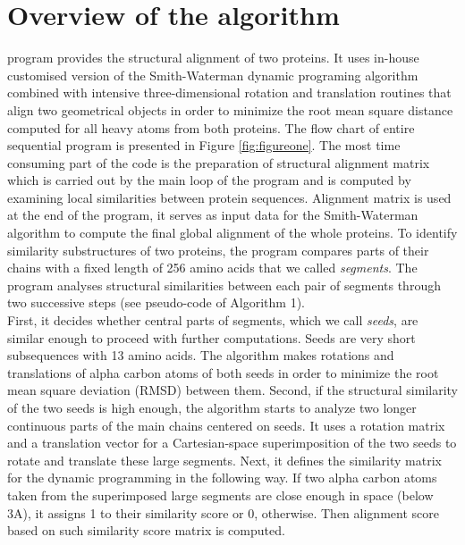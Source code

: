 \section{Overview of the algorithm}
\prog{} program provides the structural alignment of two proteins.
It uses in-house customised version of the Smith-Waterman dynamic programing
algorithm combined with intensive three-dimensional rotation and translation
routines that align two geometrical objects in order to minimize the root mean square
distance computed for all heavy atoms from both proteins.
The flow chart of entire sequential program is presented in Figure \ref{fig:figureone}.
The most time consuming part of the code is the preparation of structural
alignment matrix which is carried out by the main loop of the program and is computed by examining local similarities between protein sequences. Alignment matrix is used at the end of the program, it serves as input data for the Smith-Waterman algorithm to compute the final global alignment of the whole proteins. 
To identify similarity substructures of two proteins, the program compares
parts of their chains with a fixed length of 256 amino acids
that we called \emph{segments}.
The \prog{} program analyses structural similarities between each pair of segments through two successive steps (see pseudo-code of Algorithm 1).\\
First, it decides whether central parts of segments, which we call
\emph{seeds}, are similar enough to proceed with further computations.
Seeds are very short subsequences with 13 amino acids.
The \prog{} algorithm makes rotations and translations of alpha carbon atoms of both seeds in
order to minimize the root mean square deviation (RMSD) between them.
Second, if the structural similarity of the two seeds is high enough,
the algorithm starts to analyze two longer continuous parts of the main chains
centered on seeds.
It uses a rotation matrix and a translation vector for a Cartesian-space
superimposition of the two seeds to rotate and translate these large segments.
Next, it defines the similarity matrix for the dynamic programming in the
following way.
If two alpha carbon atoms taken from the superimposed large segments are close enough
in space (below 3A), it assigns 1 to their similarity score or 0, otherwise.
Then alignment score based on such similarity score matrix is computed.
